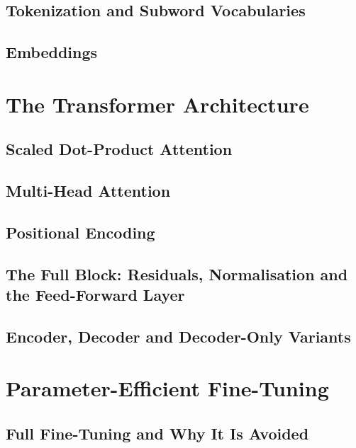 \subsection{Tokenization and Subword Vocabularies}

\subsection{Embeddings}

\section{The Transformer Architecture}
\label{sec:transformer}

\subsection{Scaled Dot-Product Attention}


\subsection{Multi-Head Attention}

\subsection{Positional Encoding}


\subsection{The Full Block: Residuals, Normalisation and the Feed-Forward Layer}

\subsection{Encoder, Decoder and Decoder-Only Variants}

\section{Parameter-Efficient Fine-Tuning}
\label{sec:peft}

\subsection{Full Fine-Tuning and Why It Is Avoided}

